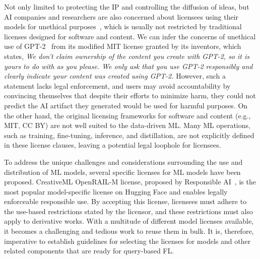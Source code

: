 Not only limited to protecting the IP and controlling the diffusion of ideas, but AI companies and researchers are also concerned about licensees using their models for unethical purposes~\cite{jobin2019global, awad2018moral, yuste2017four}, which is usually not restricted by traditional licenses designed for software and content.
We can infer the concerns of unethical use of GPT-2~\cite{radford2019language} from its modified MIT license granted by its inventors, which states, \textit{We don't claim ownership of the content you create with GPT-2, so it is yours to do with as you please. We only ask that you use GPT-2 responsibly and clearly indicate your content was created using GPT-2.} 
However, such a statement lacks legal enforcement, and users may avoid accountability by convincing themselves that despite their efforts to minimize harm, they could not predict the AI artifact they generated would be used for harmful purposes.
On the other hand, the original licensing frameworks for software and content (e.g., MIT, CC BY) are not well suited to the data-driven ML. 
Many ML operations, such as training, fine-tuning, inference, and distillation, are not explicitly defined in these license clauses, leaving a potential legal loophole for licensees.

To address the unique challenges and considerations surrounding the use and distribution of ML models, several specific licenses for ML models have been proposed. 
CreativeML OpenRAIL-M license, proposed by Responsible AI~\cite{contractor2022behavioral}, is the most popular model-specific license on Hugging Face and enables legally enforceable responsible use.
By accepting this license, licensees must adhere to the use-based restrictions stated by the licensor, and these restrictions must also apply to derivative works.
With a multitude of different model licenses available, it becomes a challenging and tedious work to reuse them in bulk. 
It is, therefore, imperative to establish guidelines for selecting the licenses for models and other related components that are ready for query-based FL.



